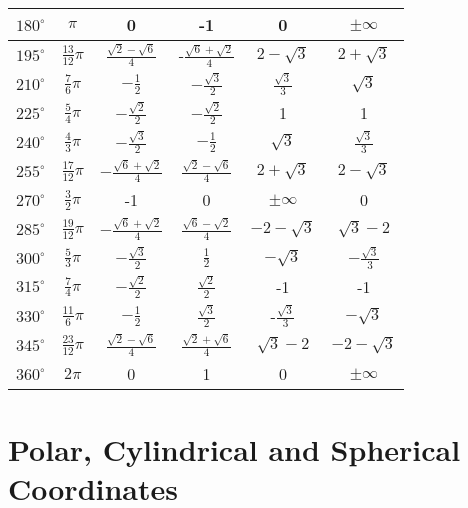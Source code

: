 \begin{tabular}{  | c | c || c | c | c | c | }
    \hline
    $180^{\circ}$     & $\pi$     & 0   &   -1   &  0    &  $\pm\infty$  \\
    \hline
	$195^{\circ}$     & $\frac{13}{12}\pi$   & $\frac{\sqrt{2}-\sqrt{6}}{4}$       &  -$\frac{\sqrt{6}+\sqrt{2}}{4}$     & $2-\sqrt{3}$   & $2+\sqrt{3}$       \\
	\hline
	$210^{\circ}$     & $\frac{7}{6}\pi$     & $-\frac{1}{2}$      &   $-\frac{\sqrt{3}}{2}$     &  $\frac{\sqrt{3}}{3}$    &  $\sqrt{3}$  \\
	\hline
  	$225^{\circ}$     & $\frac{5}{4}\pi$     & $-\frac{\sqrt{2}}{2}$      &   $-\frac{\sqrt{2}}{2}$     &  1    &  1  \\
  	\hline	
  	$240^{\circ}$     & $\frac{4}{3}\pi$     & $-\frac{\sqrt{3}}{2}$      &   $-\frac{1}{2}$     &  $\sqrt{3}$    &  $\frac{\sqrt{3}}{3}$  \\
  	\hline
     $255^{\circ}$     & $\frac{17}{12}\pi$   & $-\frac{\sqrt{6}+\sqrt{2}}{4}$       &  $\frac{\sqrt{2}-\sqrt{6}}{4}$     & $2+\sqrt{3}$   & $2-\sqrt{3}$       \\
     \hline
     $270^{\circ}$     & $\frac{3}{2}\pi$     & -1      &   0    &  $\pm\infty$    &  0  \\
     \hline	
    $285^{\circ}$     & $\frac{19}{12}\pi$   & $-\frac{\sqrt{6}+\sqrt{2}}{4}$       &  $\frac{\sqrt{6}-\sqrt{2}}{4}$     & $-2-\sqrt{3}$   & $\sqrt{3}-2$       \\
    \hline
    $300^{\circ}$     & $\frac{5}{3}\pi$     & $-\frac{\sqrt{3}}{2}$      &   $\frac{1}{2}$     &  $-\sqrt{3}$    &  $-\frac{\sqrt{3}}{3}$  \\
    \hline	
    $315^{\circ}$     & $\frac{7}{4}\pi$     & $-\frac{\sqrt{2}}{2}$      &   $\frac{\sqrt{2}}{2}$     &  -1   &  -1  \\
    \hline	
    $330^{\circ}$     & $\frac{11}{6}\pi$     & $-\frac{1}{2}$      &   $\frac{\sqrt{3}}{2}$     &  -$\frac{\sqrt{3}}{3}$   &  $-\sqrt{3}$  \\
    \hline	
     $345^{\circ}$     & $\frac{23}{12}\pi$     & $\frac{\sqrt{2}-\sqrt{6}}{4}$       &  $\frac{\sqrt{2}+\sqrt{6}}{4}$    &  $\sqrt{3}-2$    &  $-2-\sqrt{3}$  \\
     \hline	
     $360^{\circ}$     & $2\pi$   & 0       &  1     & 0   & $\pm\infty$       \\
     \hline
\end{tabular}


\section{Polar, Cylindrical and Spherical Coordinates}
